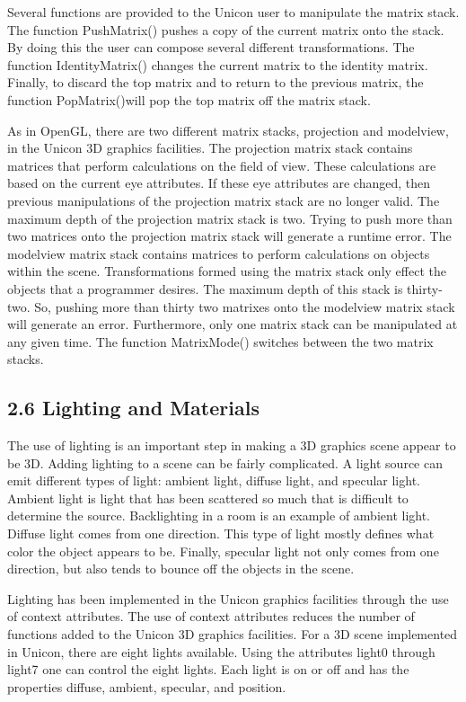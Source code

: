 \documentclass[letterpaper]{article}
\begin{document}
Several functions are provided to the Unicon user to manipulate the
matrix stack. The function \textsf{PushMatrix()} pushes a copy of the
current matrix onto the stack. By doing this the user can compose
several different transformations. The function
\textsf{IdentityMatrix()} changes the current matrix to the identity
matrix. Finally, to discard the top matrix and to return to the
previous matrix, the function \textsf{PopMatrix()}will pop the top
matrix off the matrix stack.

As in OpenGL, there are two different matrix stacks, projection and
modelview, in the Unicon 3D graphics facilities. The projection matrix
stack contains matrices that perform calculations on the field of
view. These calculations are based on the current eye attributes. If
these eye attributes are changed, then previous manipulations of the
projection matrix stack are no longer valid. The maximum depth of the
projection matrix stack is two. Trying to push more than two matrices
onto the projection matrix stack will generate a runtime error. The
modelview matrix stack contains matrices to perform calculations on
objects within the scene. Transformations formed using the matrix
stack only effect the objects that a programmer desires. The maximum
depth of this stack is thirty-two. So, pushing more than thirty two
matrixes onto the modelview matrix stack will generate an
error. Furthermore, only one matrix stack can be manipulated at any
given time. The function \textsf{MatrixMode() }switches between the
two matrix stacks.

\subsection[2.6 Lighting and Materials]{2.6 Lighting and Materials}

The use of lighting is an important step in making a 3D graphics scene
appear to be 3D. Adding lighting to a scene can be fairly
complicated. A light source can emit different types of light: ambient
light, diffuse light, and specular light. Ambient light is light
that has been scattered so much that is difficult to determine the
source. Backlighting in a room is an example of ambient light. Diffuse
light comes from one direction. This type of light mostly defines what
color the object appears to be. Finally, specular light not only comes
from one direction, but also tends to bounce off the objects in the
scene.

Lighting has been implemented in the Unicon graphics facilities
through the use of context attributes. The use of context attributes
reduces the number of functions added to the Unicon 3D graphics
facilities. For a 3D scene implemented in Unicon, there are eight
lights available. Using the attributes \textsf{light0} through
\textsf{light7} one can control the eight lights. Each light is
\textsf{on} or \textsf{off} and has the properties \textsf{diffuse},
\textsf{ambient}, \textsf{specular}, and \textsf{position}.
\end{document}
